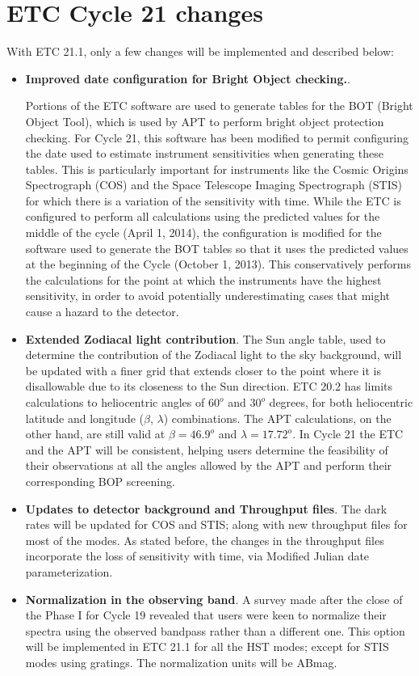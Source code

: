 \section{ETC Cycle 21 changes}

With ETC 21.1, only a few changes will be implemented and described below:

\begin{itemize}
\item {\bf{ Improved date configuration for Bright Object checking.}}.

Portions of the ETC software are used to generate tables for
the BOT (Bright Object Tool),
which is used by APT to perform bright object protection
checking. For Cycle
21, this software has been modified to permit configuring
the date used to estimate
instrument sensitivities when generating these tables.  This
is particularly important for
instruments like the Cosmic Origins Spectrograph (COS) and
the Space Telescope
Imaging Spectrograph (STIS) for which there is a variation
of the sensitivity
with time. While the ETC is configured to perform all
calculations using the predicted
values for the middle of the cycle (April 1, 2014), the
configuration is modified for
the software used to generate the BOT tables so that it uses
the predicted values at
the beginning of the Cycle (October 1, 2013). This
conservatively performs the calculations
for the point at which the instruments have the highest
sensitivity, in order to avoid potentially
underestimating cases that might cause a hazard to the detector.

\item {\bf { Extended Zodiacal light contribution}}.
The Sun angle table, used to determine the contribution of the  Zodiacal light 
to the sky background, will be updated with a finer grid that extends closer to  the point where 
it is disallowable due to its closeness to the Sun direction. ETC 20.2 has limits calculations to heliocentric
angles of $60^o$ and $30^o$ degrees, for both heliocentric latitude and longitude ($\beta$, $\lambda$)
combinations.  The APT calculations, on the other hand, are still valid at  $\beta = 46.9^o$ and
$\lambda = 17.72^o$. In Cycle 21  the ETC and the APT will
be consistent, helping users determine the feasibility of their observations at all the angles allowed
by the APT and perform their corresponding BOP screening.

\item {\bf Updates to detector background and Throughput files}.
The dark rates will be updated for COS and STIS;
 along with new  throughput files for most of the
modes. As stated before, the changes in the throughput files incorporate the loss of sensitivity with
time, via Modified Julian date parameterization.

\item {\bf Normalization in the observing band}.
A survey made after the close of the Phase I for Cycle 19 revealed that users were
keen to normalize their spectra using the observed bandpass rather than a different one.
This option will be implemented in ETC 21.1 for all the HST modes; except for STIS modes using
gratings. The normalization units will be ABmag.


\end{itemize}


